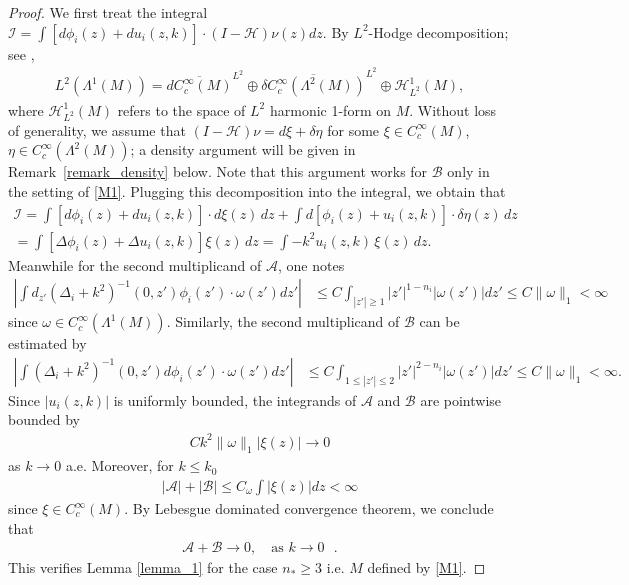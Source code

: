 \documentclass[12pt]{amsart}
\begin{document}
\begin{proof}
We first treat the integral $\mathcal{I} = \int \left[ d\phi_i(z) + du_i(z,k) \right] \cdot (I-\mathcal{H})\nu(z) dz$. By $L^2$-Hodge decomposition; see \cite{KK},
\begin{align*}
    L^2(\Lambda^1(M)) = \overline{d C_c^\infty(M)}^{L^2} \oplus \overline{\delta C_c^\infty(\Lambda^2(M))}^{L^2} \oplus \mathcal{H}_{L^2}^1(M),
\end{align*}
where $\mathcal{H}_{L^2}^1(M)$ refers to the space of $L^2$ harmonic 1-form on $M$. Without loss of generality, we assume that $(I-\mathcal{H})\nu = d\xi + \delta \eta$ for some $\xi \in C_c^\infty(M)$, $\eta \in C_c^\infty(\Lambda^2(M))$; a density argument will be given in Remark~\ref{remark_density} below. Note that this argument  works for  $\mathcal{B}$ only in the setting of \eqref{M1}. Plugging this decomposition into the integral, we obtain that 
\begin{align*}
\mathcal{I} = \int \left[ d\phi_i(z) + du_i(z,k) \right] \cdot d\xi(z) \, dz 
    + \int d\left[ \phi_i(z) + u_i(z,k) \right] \cdot \delta\eta(z) \, dz
    \\= \int \left[ \Delta\phi_i(z) + \Delta u_i(z,k) \right] \xi(z) \, dz 
    = \int -k^2 u_i(z,k) \, \xi(z) \, dz.
\end{align*}
Meanwhile for the second multiplicand of $\mathcal{A}$, one notes
\begin{align}\label{eq_Lemma_1}
    \left| \int d_{z'}(\Delta_i+k^2)^{-1}(0,z') \phi_i(z') \cdot \omega(z') dz' \right| &\le C \int_{|z'|\ge 1} |z'|^{1-n_i}{|\omega(z')|} dz' \le C \|\omega\|_1 <\infty
\end{align}
since $\omega \in C_c^\infty(\Lambda^1(M))$. Similarly, the second multiplicand of $\mathcal{B}$ can be estimated by
\begin{align}\label{Holder2}
    \left|\int (\Delta_i+k^2)^{-1}(0,z') d\phi_i(z') \cdot \omega(z') dz' \right| &\le C \int_{1\le |z'|\le 2} |z'|^{2-n_i} |\omega(z')| dz'\le C \|\omega\|_1<\infty.
\end{align}
Since $|u_i(z,k)|$ is uniformly bounded, the integrands of $\mathcal{A}$ and $\mathcal{B}$ are pointwise bounded by
\begin{align*}
    C k^2 \|\omega\|_1  |\xi(z)| \to 0
\end{align*}
as $k \to 0$ a.e. Moreover, for $k\le k_0$
\begin{align*}
    |\mathcal{A}|+|\mathcal{B}| \le C_\omega \int |\xi(z)| dz < \infty 
\end{align*}
since $\xi \in C_c^\infty(M)$. By Lebesgue dominated convergence theorem, we conclude that
\begin{align*}
    \mathcal{A} +\mathcal{B} \to 0, \quad \textrm{as $k\to 0$ }.
\end{align*}
This verifies Lemma \ref{lemma_1} for the case  $n_*\ge 3$ i.e. $M$ defined by \eqref{M1}.


\end{proof}
\end{document}
